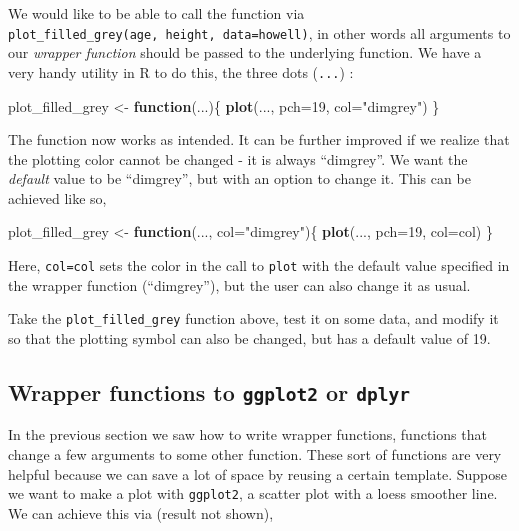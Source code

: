 \documentclass[]{book}
\newenvironment{Shaded}{\begin{snugshade}}{\end{snugshade}}
\newcommand{\ControlFlowTok}[1]{\textcolor[rgb]{0.13,0.29,0.53}{\textbf{#1}}}
\newcommand{\DataTypeTok}[1]{\textcolor[rgb]{0.13,0.29,0.53}{#1}}
\newcommand{\DecValTok}[1]{\textcolor[rgb]{0.00,0.00,0.81}{#1}}
\newcommand{\KeywordTok}[1]{\textcolor[rgb]{0.13,0.29,0.53}{\textbf{#1}}}
\newcommand{\NormalTok}[1]{#1}
\newcommand{\StringTok}[1]{\textcolor[rgb]{0.31,0.60,0.02}{#1}}
\let\BeginKnitrBlock\begin \let\EndKnitrBlock\end
\begin{document}
We would like to be able to call the function via \texttt{plot\_filled\_grey(age,\ height,\ data=howell)}, in other words all arguments to our \emph{wrapper function} should be passed to the underlying function. We have a very handy utility in R to do this, the three dots (\texttt{...}) :

\begin{Shaded}
\begin{Highlighting}[]
\NormalTok{plot_filled_grey <-}\StringTok{ }\ControlFlowTok{function}\NormalTok{(...)\{}
  \KeywordTok{plot}\NormalTok{(..., }\DataTypeTok{pch=}\DecValTok{19}\NormalTok{, }\DataTypeTok{col=}\StringTok{"dimgrey"}\NormalTok{)}
\NormalTok{\}}
\end{Highlighting}
\end{Shaded}

The function now works as intended. It can be further improved if we realize that the plotting color cannot be changed - it is always ``dimgrey''. We want the \emph{default} value to be ``dimgrey'', but with an option to change it. This can be achieved like so,

\begin{Shaded}
\begin{Highlighting}[]
\NormalTok{plot_filled_grey <-}\StringTok{ }\ControlFlowTok{function}\NormalTok{(..., }\DataTypeTok{col=}\StringTok{"dimgrey"}\NormalTok{)\{}
  \KeywordTok{plot}\NormalTok{(..., }\DataTypeTok{pch=}\DecValTok{19}\NormalTok{, }\DataTypeTok{col=}\NormalTok{col)}
\NormalTok{\}}
\end{Highlighting}
\end{Shaded}

Here, \texttt{col=col} sets the color in the call to \texttt{plot} with the default value specified in the wrapper function (``dimgrey''), but the user can also change it as usual.

\BeginKnitrBlock{rmdtry}
Take the \texttt{plot\_filled\_grey} function above, test it on some data, and modify it so that the plotting symbol can also be changed, but has a default value of 19.
\EndKnitrBlock{rmdtry}

\hypertarget{wrapper-functions-to-ggplot2-or-dplyr}{%
\subsection{\texorpdfstring{Wrapper functions to \texttt{ggplot2} or \texttt{dplyr}}{Wrapper functions to ggplot2 or dplyr}}\label{wrapper-functions-to-ggplot2-or-dplyr}}

In the previous section we saw how to write wrapper functions, functions that change a few arguments to some other function. These sort of functions are very helpful because we can save a lot of space by reusing a certain template. Suppose we want to make a plot with \texttt{ggplot2}, a scatter plot with a loess smoother line. We can achieve this via (result not shown),
\end{document}
